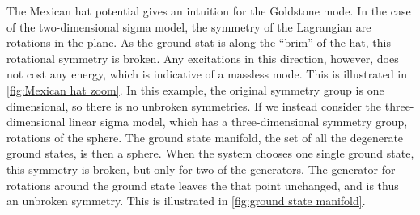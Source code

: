 The Mexican hat potential gives an intuition for the Goldstone mode.
In the case of the two-dimensional sigma model, the symmetry of the Lagrangian are rotations in the plane.
As the ground stat is along the ``brim'' of the hat, this rotational symmetry is broken.
Any excitations in this direction, however, does not cost any energy, which is indicative of a massless mode.
This is illustrated in \autoref{fig:Mexican hat zoom}.
In this example, the original symmetry group is one dimensional, so there is no unbroken symmetries.
If we instead consider the three-dimensional linear sigma model, which has a three-dimensional symmetry group, rotations of the sphere.
The ground state manifold, the set of all the degenerate ground states, is then a sphere.
When the system chooses one single ground state, this symmetry is broken, but only for two of the generators. 
The generator for rotations around the ground state leaves the that point unchanged, and is thus an unbroken symmetry.
This is illustrated in \autoref{fig:ground state manifold}.

